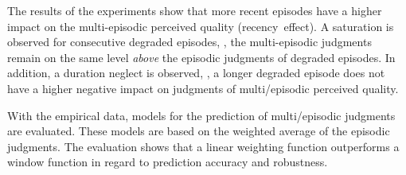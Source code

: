 The results of the experiments show that more recent episodes have a higher impact on the multi-episodic perceived quality (recency~effect). 
A saturation is observed for consecutive degraded episodes, \ie, the multi-episodic judgments remain on the same level \emph{above} the episodic judgments of degraded episodes.
In addition, a duration neglect is observed, \ie, a longer degraded episode does not have a higher negative impact on judgments of multi\-/episodic perceived quality. 


With the empirical data, models for the prediction of multi\-/episodic judgments are evaluated.
These models are based on the weighted average of the episodic judgments.
The evaluation shows that a linear weighting function outperforms a window function in regard to prediction accuracy and robustness.

\vfill

